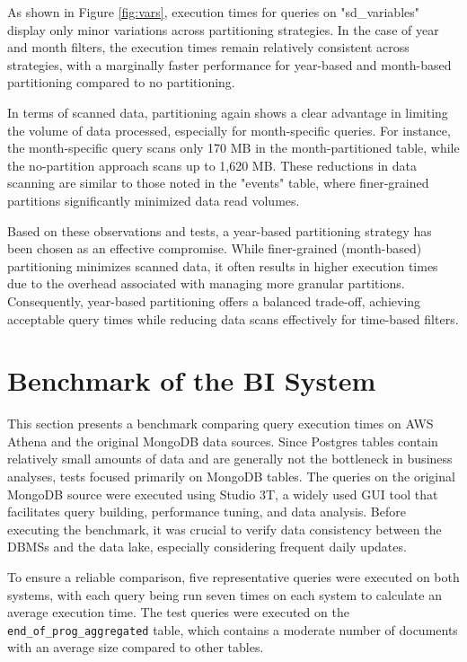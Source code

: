 As shown in Figure \ref{fig:vars}, execution times for queries on "sd\_variables" display only minor variations across partitioning strategies. In the case of year and month filters, the execution times remain relatively consistent across strategies, with a marginally faster performance for year-based and month-based partitioning compared to no partitioning.

In terms of scanned data, partitioning again shows a clear advantage in limiting the volume of data processed, especially for month-specific queries. For instance, the month-specific query scans only 170 MB in the month-partitioned table, while the no-partition approach scans up to 1,620 MB. These reductions in data scanning are similar to those noted in the "events" table, where finer-grained partitions significantly minimized data read volumes.

Based on these observations and tests, a year-based partitioning strategy has been chosen as an effective compromise. While finer-grained (month-based) partitioning minimizes scanned data, it often results in higher execution times due to the overhead associated with managing more granular partitions. Consequently, year-based partitioning offers a balanced trade-off, achieving acceptable query times while reducing data scans effectively for time-based filters.

\section{Benchmark of the BI System}
This section presents a benchmark comparing query execution times on \ac{AWS} Athena and the original MongoDB data sources. Since Postgres tables contain relatively small amounts of data and are generally not the bottleneck in business analyses, tests focused primarily on MongoDB tables. The queries on the original MongoDB source were executed using Studio 3T, a widely used GUI tool that facilitates query building, performance tuning, and data analysis. Before executing the benchmark, it was crucial to verify data consistency between the DBMSs and the data lake, especially considering frequent daily updates.

To ensure a reliable comparison, five representative queries were executed on both systems, with each query being run seven times on each system to calculate an average execution time. The test queries were executed on the \texttt{end\_of\_prog\_aggregated} table, which contains a moderate number of documents with an average size compared to other tables.

